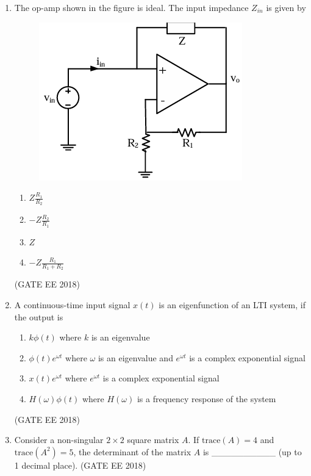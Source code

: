 \documentclass[journal,12pt,onecolumn]{IEEEtran}
\theoremstyle{remark}
\begin{document}
\begin{enumerate}
    \item The op-amp shown in the figure is ideal. The input impedance $Z_{in}$ is given by
    \begin{figure}[H]
    \centering
    \includegraphics[]{figs/Q.15.png}
    \caption{}
    \label{fig:5}
\end{figure}
    \begin{multicols}{2}
    \begin{enumerate}
        \item $Z \frac{R_{1}}{R_{2}}$
        \item $-Z \frac{R_{2}}{R_{1}}$
        \item $Z$
        \item $-Z \frac{R_{1}}{R_{1}+R_{2}}$
    \end{enumerate}
    \end{multicols}
    \hfill{(GATE EE 2018)}

    \item A continuous-time input signal $x(t)$ is an eigenfunction of an LTI system, if the output is
    \begin{enumerate}
        \item $k \phi(t)$ where $k$ is an eigenvalue
        \item $\phi(t) e^{\omega t}$ where $\omega$ is an eigenvalue and $e^{\omega t}$ is a complex exponential signal
        \item $x(t) e^{\omega t}$ where $e^{\omega t}$ is a complex exponential signal
        \item $H(\omega) \phi(t)$ where $H(\omega)$ is a frequency response of the system
    \end{enumerate}
    \hfill{(GATE EE 2018)}

    \item Consider a non-singular $2 \times 2$ square matrix $A$. If $\text{trace}(A) = 4$ and $\text{trace}(A^{2}) = 5$, the determinant of the matrix $A$ is \_\_\_\_\_\_\_\_\_\_ (up to 1 decimal place).
    \hfill{(GATE EE 2018)}
    

\end{enumerate}
\end{document}
